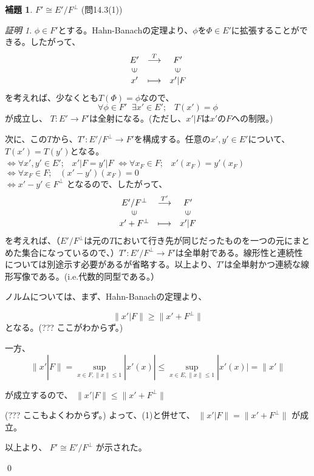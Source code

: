 \documentclass[11pt,a4paper]{amsart}
\theoremstyle{definition}
\newtheorem{lem}{補題}
\theoremstyle{definition}
\theoremstyle{remark}
\newtheorem{prf}{証明}
\begin{document}
\begin{lem}
$F' \cong E' / F^\bot$  (問14.3(1))
\end{lem}
\begin{prf}
$\phi \in F'$とする。Hahn-Banachの定理より、$\phi$を$\Phi \in E'$に拡張することができる。したがって、
$$
\begin{array}{ccc}
E' & \stackrel{T}{\longrightarrow} & F' \\
\rotatebox{90}{$\in$} & & \rotatebox{90}{$\in$} \\
x' & \longmapsto & x'|F
\end{array}
$$
を考えれば、少なくとも$T(\Phi)=\phi$なので、
$$\forall \phi \in F' \;\; \exists x' \in E'; \;\;\; T(x')=\phi$$
が成立し、
$T:E' \to F'$は全射になる。(ただし、$x'|F$は$x'$の$F$への制限。)

次に、この$T$から、$T':E'/F^\bot \to F'$を構成する。任意の$x',y' \in E'$について、$T(x')=T(y')$となる。\\
$\Longleftrightarrow \forall x',y' \in E'; \;\;\; x'|F = y'|F$
\;\;\;$\Longleftrightarrow \forall x_F \in F; \;\;\; x'(x_F)=y'(x_F)$
\;\;\;$\Longleftrightarrow \forall x_F \in F; \;\;\; (x'-y')(x_F)=0$\\
$\Longleftrightarrow x'-y' \in F^\bot$
となるので、したがって、
$$
\begin{array}{ccc}
E' / F^\bot & \stackrel{T'}{\longrightarrow} & F' \\
\rotatebox{90}{$\in$} & & \rotatebox{90}{$\in$} \\
x'+F^\bot & \longmapsto & x'|F
\end{array}
$$
を考えれば、（$E'/F^\bot$は元の$T$において行き先が同じだったものを一つの元にまとめた集合になっているので、）$T':E' / F^\bot \to F'$は全単射である。線形性と連続性については別途示す必要があるが省略する。以上より、$T'$は全単射かつ連続な線形写像である。(i.e.代数的同型である。）

ノルムについては、まず、Hahn-Banachの定理より、

\begin{equation}
\|x'|F\| \geq \| x'+F^\bot \|
\end{equation}
となる。(??? ここがわからず。)

一方、
$$
\|x'|F\| = \sup_{x \in F, \|x\| \leq 1} |x'(x)|
\leq \sup_{x \in E, \|x\| \leq 1}|x'(x)|
= \|x'\|
$$

が成立するので、
$\|x'|F\| \leq \| x'+F^\bot \|$

(??? ここもよくわからず。)
よって、(1)と併せて、
$\|x'|F\| = \| x'+F^\bot \|$
が成立。

以上より、
$F' \cong E'/F^\bot$
が示された。

\qed
\end{prf}
\end{document}
